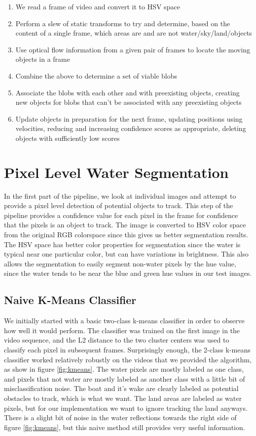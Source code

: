 \documentclass{article}
\begin{document}
\begin{enumerate}
\item We read a frame of video and convert it to HSV space
\item Perform a slew of static transforms to try and determine,
      based on the content of a single frame, which areas are and
      are not water/sky/land/objects
\item Use optical flow information from a given pair of frames to
      locate the moving objects in a frame
\item Combine the above to determine a set of viable blobs
\item Associate the blobs with each other and with preexisting objects,
      creating new objects for blobs that can't be associated with any
      preexisting objects
\item Update objects in preparation for the next frame, updating
      positions using velocities, reducing and increasing confidence
      scores as appropriate, deleting objects with sufficiently low
      scores
\end{enumerate}

\section{Pixel Level Water Segmentation}
In the first part of the pipeline, we look at individual images and attempt to
provide a pixel level detection of potential objects to track.  This step of the
pipeline provides a confidence value for each pixel in the frame for confidence
that the pixels is an object to track.
The image is converted to HSV color space from the original RGB colorspace since
this gives us better segmentation results. The HSV space has better color
properties for segmentation since the water is typical near one particular
color, but can have variations in brightness.  This also allows the segmentation
to easily segment non-water pixels by the hue value, since the water tends to be
near the blue and green hue values in our test images.

\subsection{Naive K-Means Classifier}
We initially started with a basic two-class k-means classifier in order to
observe how well it would perform.  The classifier was trained on the first
image in the video sequence, and the L2 distance to the two cluster centers was
used to classify each pixel in subsequent frames.  Surprisingly enough, the
2-class k-means classifier worked relatively robustly on the videos that we
provided the algorithm, as show in figure \ref{fig:kmeans}.  The water pixels
are mostly labeled as one class, and pixels that not water are mostly labeled as
another class with a little bit of misclassification noise.  The boat and it's
wake are clearly labeled as potential obstacles to track, which is what we want.
The land areas are labeled as water pixels, but for our implementation we want
to ignore tracking the land anyways. There is a slight bit of noise in the water
reflections towards the right side of figure \ref{fig:kmeans}, but this naive
method still provides very useful information.
\end{document}
